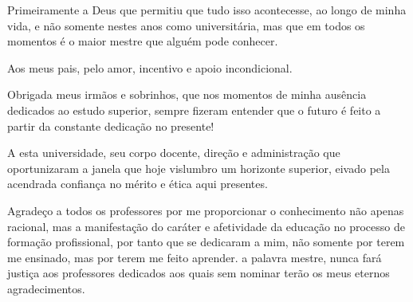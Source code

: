 Primeiramente a Deus que permitiu que tudo isso acontecesse, ao longo de minha vida, 
e não somente nestes anos como universitária, mas que em todos os momentos é o maior 
mestre que alguém pode conhecer.
	
Aos meus pais, pelo amor, incentivo e apoio incondicional.

Obrigada meus irmãos e sobrinhos, que nos momentos de minha ausência dedicados ao estudo superior, 
sempre fizeram entender que o futuro é feito a partir da constante dedicação no presente!

A esta universidade, seu corpo docente, direção e administração que oportunizaram a janela que hoje vislumbro 
um horizonte superior, eivado pela acendrada confiança no mérito e ética aqui presentes.

Agradeço a todos os professores por me proporcionar o conhecimento não apenas racional, mas a manifestação 
do caráter e afetividade da educação no processo de formação profissional, por tanto que se dedicaram a mim, 
não somente por terem me ensinado, mas por terem me feito aprender. a palavra mestre, nunca fará justiça aos 
professores dedicados aos quais sem nominar terão os meus eternos agradecimentos.